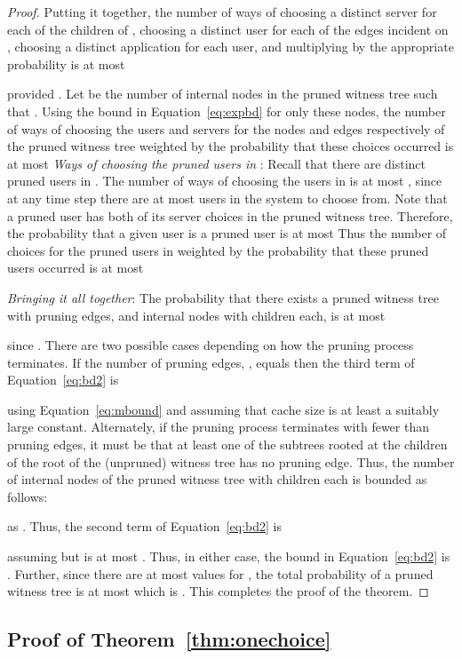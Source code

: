 \documentclass[conference]{IEEEtran}
\begin{document}
\begin{proof}
Putting it together, the number of ways of choosing a distinct
server for each of the  children of , choosing a distinct
user for each of the  edges incident on , choosing a distinct application for each user, and  multiplying by the appropriate probability is at most 
 
provided .
Let  be the number of internal nodes  in the pruned witness tree
such that . Using the bound in Equation~\ref{eq:expbd}
for only these  nodes, the number of ways of choosing the users
and servers for the nodes and edges respectively of the pruned witness tree
weighted by the probability that these choices occurred is at most 
{\em Ways of choosing the pruned users in }: Recall that there are  distinct pruned users  in . The number of ways of choosing the users in  is at
most , since at any time step there are at most  users in the system to choose from. Note that a pruned user has both of its
server choices in the pruned witness tree. Therefore, the probability that a given user is a pruned user is at most  Thus the number of choices for the
 pruned users in  weighted by the probability
that these pruned users occurred is at most

{\em Bringing it all together}: The probability that
there exists a pruned
witness tree with  pruning edges, and  internal nodes with  children each, is at most

since .
There are two possible cases depending on how the pruning process terminates. If the number of pruning edges, , equals  then the third term of Equation~\ref{eq:bd2} is 

using Equation~\ref{eq:mbound} and assuming that cache size  is at least  a suitably large constant.
Alternately, if the pruning process terminates with fewer than  pruning edges, it must be that at least one of the  subtrees rooted at the children of the root  of the 
(unpruned) witness tree has no pruning edge. Thus, the number of internal nodes  of the pruned witness tree with  children  each is bounded as follows:
 
as . Thus, the second term of Equation~\ref{eq:bd2} is 
 
assuming   but is at most .
Thus, in either case, the bound in
Equation~\ref{eq:bd2} is . Further, since there
are at most
 values for , the total probability of a pruned
witness tree is at most
 which is
. This completes the proof of the theorem. 
\end{proof}




\subsection{Proof of Theorem~\ref{thm:onechoice}}
\end{document}
